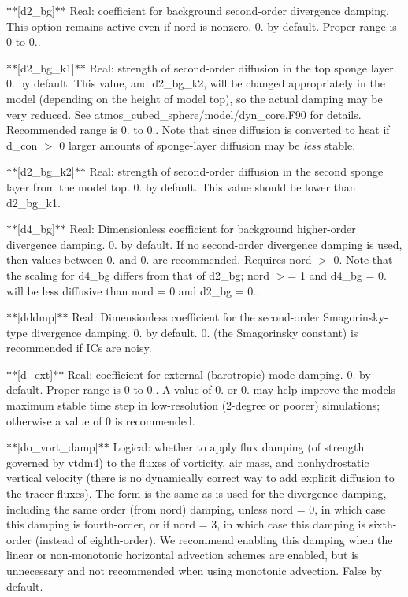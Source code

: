 $\ast$$\ast$\mbox{[}d2\-\_\-bg\mbox{]}$\ast$$\ast$ Real\-: coefficient for background second-\/order divergence damping. This option remains active even if nord is nonzero. 0. by default. Proper range is 0 to 0..

$\ast$$\ast$\mbox{[}d2\-\_\-bg\-\_\-k1\mbox{]}$\ast$$\ast$ Real\-: strength of second-\/order diffusion in the top sponge layer. 0. by default. This value, and d2\-\_\-bg\-\_\-k2, will be changed appropriately in the model (depending on the height of model top), so the actual damping may be very reduced. See atmos\-\_\-cubed\-\_\-sphere/model/dyn\-\_\-core.\-F90 for details. Recommended range is 0. to 0.. Note that since diffusion is converted to heat if d\-\_\-con $>$ 0 larger amounts of sponge-\/layer diffusion may be {\itshape less} stable.

$\ast$$\ast$\mbox{[}d2\-\_\-bg\-\_\-k2\mbox{]}$\ast$$\ast$ Real\-: strength of second-\/order diffusion in the second sponge layer from the model top. 0. by default. This value should be lower than d2\-\_\-bg\-\_\-k1.

$\ast$$\ast$\mbox{[}d4\-\_\-bg\mbox{]}$\ast$$\ast$ Real\-: Dimensionless coefficient for background higher-\/order divergence damping. 0. by default. If no second-\/order divergence damping is used, then values between 0. and 0. are recommended. Requires nord $>$ 0. Note that the scaling for d4\-\_\-bg differs from that of d2\-\_\-bg; nord $>$= 1 and d4\-\_\-bg = 0. will be less diffusive than nord = 0 and d2\-\_\-bg = 0..

$\ast$$\ast$\mbox{[}dddmp\mbox{]}$\ast$$\ast$ Real\-: Dimensionless coefficient for the second-\/order Smagorinsky-\/type divergence damping. 0. by default. 0. (the Smagorinsky constant) is recommended if I\-Cs are noisy.

$\ast$$\ast$\mbox{[}d\-\_\-ext\mbox{]}$\ast$$\ast$ Real\-: coefficient for external (barotropic) mode damping. 0. by default. Proper range is 0 to 0.. A value of 0. or 0. may help improve the models maximum stable time step in low-\/resolution (2-\/degree or poorer) simulations; otherwise a value of 0 is recommended.

$\ast$$\ast$\mbox{[}do\-\_\-vort\-\_\-damp\mbox{]}$\ast$$\ast$ Logical\-: whether to apply flux damping (of strength governed by vtdm4) to the fluxes of vorticity, air mass, and nonhydrostatic vertical velocity (there is no dynamically correct way to add explicit diffusion to the tracer fluxes). The form is the same as is used for the divergence damping, including the same order (from nord) damping, unless nord = 0, in which case this damping is fourth-\/order, or if nord = 3, in which case this damping is sixth-\/order (instead of eighth-\/order). We recommend enabling this damping when the linear or non-\/monotonic horizontal advection schemes are enabled, but is unnecessary and not recommended when using monotonic advection. False by default.

